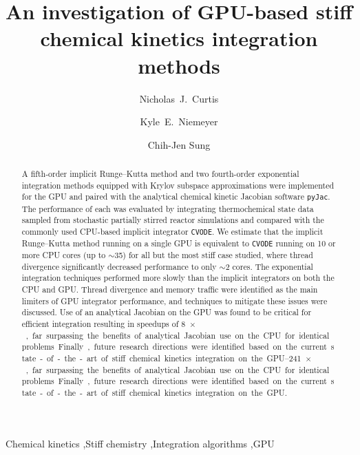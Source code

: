 \documentclass[preprint]{elsarticle}
\begin{document}
\begin{frontmatter}

\title{An investigation of GPU-based stiff chemical kinetics integration methods}

\author[uconn]{Nicholas~J.\ Curtis}
\author[osu]{Kyle~E.\ Niemeyer}
\author[uconn]{Chih-Jen Sung}

\address[uconn]{Department of Mechanical Engineering\\
  University of Connecticut, Storrs, CT, 06269, USA}
\address[osu]{School of Mechanical, Industrial, and Manufacturing Engineering\\
  Oregon State University, Corvallis, OR 97331, USA}
  

\begin{abstract}
A fifth-order implicit Runge--Kutta method and two fourth-order exponential integration methods equipped with Krylov subspace approximations were implemented for the GPU and paired with the analytical chemical kinetic Jacobian software \texttt{pyJac}.
The performance of each was evaluated by integrating thermochemical state data sampled from stochastic partially stirred reactor simulations and compared with the commonly used CPU-based implicit integrator \texttt{CVODE}.
We estimate that the implicit Runge--Kutta method running on a single GPU is equivalent to \texttt{CVODE} running on \num{10} or more CPU cores (up to $\sim$\num{35}) for all but the most stiff case studied, where thread divergence significantly decreased performance to only $\sim$\num{2} cores.
The exponential integration techniques performed more slowly than the implicit integrators on both the CPU and GPU.
Thread divergence and memory traffic were identified as the main limiters of GPU integrator performance, and techniques to mitigate these issues were discussed.
Use of an analytical Jacobian on the GPU was found to be critical for efficient integration resulting in speedups of \SIrange{8}{241}{$\times$}, far surpassing the benefits of analytical Jacobian use on the CPU for identical problems.
Finally, future research directions were identified based on the current state-of-the-art of stiff chemical kinetics integration on the GPU.
\end{abstract}

\begin{keyword}
 Chemical kinetics \sep Stiff chemistry \sep Integration algorithms \sep GPU
\end{keyword}

\end{frontmatter}
\end{document}
